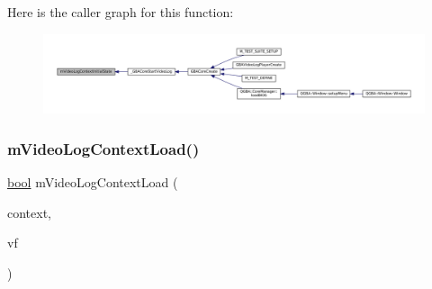 Here is the caller graph for this function\+:
\nopagebreak
\begin{figure}[H]
\begin{center}
\leavevmode
\includegraphics[width=350pt]{video-logger_8c_aa9a3f77cb1a532bdc62db67c0724697f_icgraph}
\end{center}
\end{figure}
\mbox{\label{video-logger_8c_ab20aa19e19c6e5eb89100137495bfef1}} 
\subsubsection{\texorpdfstring{m\+Video\+Log\+Context\+Load()}{mVideoLogContextLoad()}}
{\footnotesize\ttfamily \mbox{\hyperlink{libretro_8h_a4a26dcae73fb7e1528214a068aca317e}{bool}} m\+Video\+Log\+Context\+Load (\begin{DoxyParamCaption}\item[{struct m\+Video\+Log\+Context $\ast$}]{context,  }\item[{struct V\+File $\ast$}]{vf }\end{DoxyParamCaption})}

